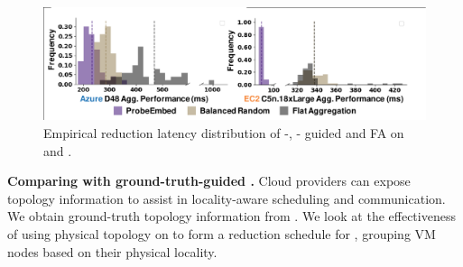 \begin{figure}
	\centering
	\includegraphics[width=.7\linewidth, trim=2 5 20 20,clip]{Figures/probeembedvsrandomvsflat.pdf}
	\caption{Empirical reduction latency distribution of \marcopolo-, \strongrandom- guided \mlha and FA on \azure and \ectwo.}
	\label{fig:probeembedvsrandomvsflat}
\end{figure}


\noindent\textbf{Comparing with ground-truth-guided \mlha.}
Cloud providers can expose topology information to assist in locality-aware scheduling and communication. We obtain ground-truth topology information from \azure. We look at the effectiveness of using physical topology on \azure to form a reduction schedule for \mlha, grouping VM nodes based on their physical locality. %




